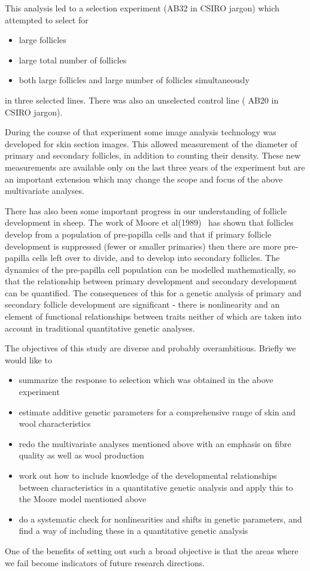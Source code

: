 \documentclass[titlepage]{article}  %
\begin{document}
	This analysis led to a selection experiment (AB32 in CSIRO jargon) which attempted to select for
\begin{itemize}
\item large follicles
\item large total number of follicles
\item both large follicles and large number of follicles simultaneously
\end{itemize}
in three selected lines. There was also an unselected control line ( AB20 in CSIRO jargon).

During the course of that experiment some image analysis technology was developed for skin section images. This allowed measurement of the diameter of primary and secondary follicles, in addition to counting their density. These new measurements are available only on the last three years of the experiment but are an important extension which may change the scope and focus of the above multivariate analyses.

There has also been some important progress in our understanding of follicle development in sheep. The work of Moore et al(1989)~\cite{moor:89} has shown that follicles develop from a population of pre-papilla cells and that if primary follicle development is suppressed (fewer or smaller primaries) then there are more pre-papilla cells left over to divide, and to develop into secondary follicles. The dynamics of the pre-papilla cell population can be modelled mathematically, so that the relationship between primary development and secondary development can be quantified. The consequences of this for a genetic analysis of primary and secondary follicle development are significant - there is nonlinearity and an element of functional relationships between traits neither of which are taken into account in traditional quantitative genetic analyses.

The objectives of this study  are diverse and probably overambitious. Briefly we would like to
\begin{itemize}
\item summarize the response to selection which was obtained in the above experiment
\item estimate additive genetic parameters for a comprehensive range of skin and wool characteristics
\item redo the multivariate analyses mentioned above with an emphasis on fibre quality as well as wool production
\item work out how to include knowledge of the developmental relationships between characteristics in a quantitative genetic analysis and apply this to the Moore model mentioned above
\item do a systematic check for nonlinearities and shifts in genetic parameters, and find a way of including these in a quantitative genetic analysis
\end{itemize}
One of the benefits of setting out such a broad objective is that the areas where we fail become indicators of future research directions.
\end{document}

